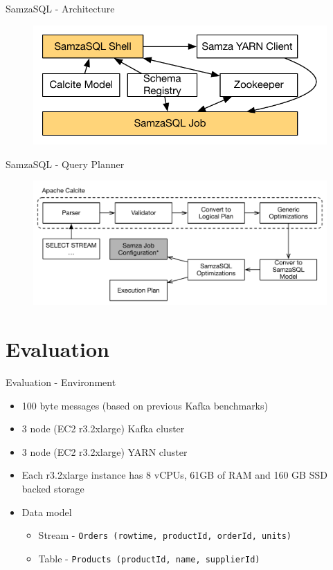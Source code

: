 \documentclass[newPxFont]{beamer}
\begin{document}
\begin{frame}[c]{SamzaSQL - Architecture}
\begin{figure}
		\centering
		\includegraphics[width=0.9\linewidth]{samzasql-arch.pdf}
	\end{figure}
\end{frame}


\begin{frame}[c]{SamzaSQL - Query Planner}
\begin{figure}
		\centering
		\includegraphics[width=0.9\linewidth]{query-planner.pdf}
	\end{figure}
\end{frame}

\section{Evaluation}

\begin{frame}[c]{Evaluation - Environment}
\begin{itemize}
	\item 100 byte messages (based on previous Kafka benchmarks) 
	\item 3 node (EC2 r3.2xlarge) Kafka cluster
	\item 3 node (EC2 r3.2xlarge) YARN cluster
	\item Each r3.2xlarge instance has 8 vCPUs, 61GB of RAM and 160 GB SSD backed storage
	\item Data model
		\begin{itemize}
			\item Stream - \texttt{Orders (rowtime, productId, orderId, units)} 
			\item Table - \texttt{Products (productId, name, supplierId)} 
		\end{itemize}
\end{itemize}
\end{frame}
\end{document}

